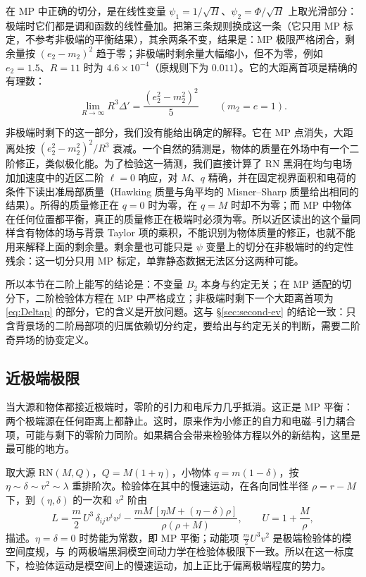 \documentclass[11pt,a4paper]{ctexart}
\begin{document}
在 MP 中正确的切分，是在线性变量 $\psi_1=1/\sqrt H$、$\psi_2=\Phi/\sqrt H$ 上取光滑部分：极端时它们都是调和函数的线性叠加。把第三条规则换成这一条（它只用 MP 标定，不参考非极端的平衡结果），其余两条不变，结果是：MP 极限严格闭合，剩余量按 $(e_2-m_2)^2$ 趋于零；非极端时剩余量大幅缩小，但不为零，例如 $e_2=1.5$、$R=11$ 时为 $4.6\times10^{-4}$（原规则下为 $0.011$）。它的大距离首项是精确的有理数：
\begin{equation}
\lim_{R\to\infty}R^3\Delta'=\frac{(e_2^2-m_2^2)^2}{5}\qquad(m_2=e=1).
\label{eq:Deltap}
\end{equation}

非极端时剩下的这一部分，我们没有能给出确定的解释。它在 MP 点消失，大距离处按 $(e_2^2-m_2^2)^2/R^3$ 衰减。一个自然的猜测是，物体的质量在外场中有一个二阶修正，类似极化能。为了检验这一猜测，我们直接计算了 RN 黑洞在均匀电场加加速度中的近区二阶 $\ell=0$ 响应，对 $M$、$q$ 精确，并在固定视界面积和电荷的条件下读出准局部质量（Hawking 质量与角平均的 Misner--Sharp 质量给出相同的结果）。所得的质量修正在 $q=0$ 时为零，在 $q=M$ 时却不为零；而 MP 中物体在任何位置都平衡，真正的质量修正在极端时必须为零。所以近区读出的这个量同样含有物体的场与背景 Taylor 项的乘积，不能识别为物体质量的修正，也就不能用来解释上面的剩余量。剩余量也可能只是 $\psi$ 变量上的切分在非极端时的约定性残余：这一切分只用 MP 标定，单靠静态数据无法区分这两种可能。

所以本节在二阶上能写的结论是：不变量 $B_2$ 本身与约定无关；在 MP 适配的切分下，二阶检验体方程在 MP 中严格成立；非极端时剩下一个大距离首项为 \eqref{eq:Deltap} 的部分，它的含义是开放问题。这与 \S\ref{sec:second-ev} 的结论一致：只含背景场的二阶局部项的归属依赖切分约定，要给出与约定无关的判断，需要二阶奇异场的协变定义。

\subsection{近极端极限}\label{sec:o-extremal}

当大源和物体都接近极端时，零阶的引力和电斥力几乎抵消。这正是 MP 平衡：两个极端源在任何距离上都静止。这时，原来作为小修正的自力和电磁--引力耦合项，可能与剩下的零阶力同阶。如果耦合会带来检验体方程以外的新结构，这里是最可能的地方。

取大源 RN$(M,Q)$，$Q=M(1+\eta)$，小物体 $q=m(1-\delta)$，按 $\eta\sim\delta\sim v^2\sim\lambda$ 重排阶次。检验体在其中的慢速运动，在各向同性半径 $\rho=r-M$ 下，到 $(\eta,\delta)$ 的一次和 $v^2$ 阶由
\begin{equation}
L=\frac m2\,U^3\,\delta_{ij}v^iv^j-\frac{mM\,[\eta M+(\eta-\delta)\rho]}{\rho(\rho+M)},\qquad U=1+\frac M\rho ,
\label{eq:r2L}
\end{equation}
描述。$\eta=\delta=0$ 时势能为常数，即 MP 平衡；动能项 $\tfrac m2U^3v^2$ 是极端检验体的模空间度规，与 \citet{FerrellEardley1987} 的两极端黑洞模空间动力学在检验体极限下一致。所以在这一标度下，检验体运动是模空间上的慢速运动，加上正比于偏离极端程度的势力。
\end{document}
